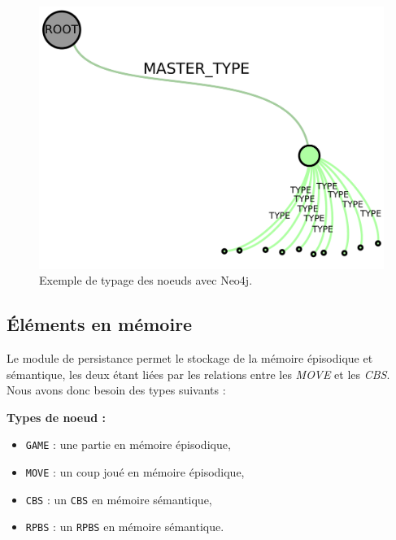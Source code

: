 \begin{figure}[H]
\includegraphics[width=\textwidth]{files/neo4j/example_node_type}
\caption{Exemple de typage des noeuds avec Neo4j.}
\label{example_node_type}
\end{figure}

\subsection{Éléments en mémoire}

Le module de persistance permet le stockage de la mémoire épisodique et sémantique, les deux étant liées par les relations entre les \emph{MOVE} et les \emph{CBS}. Nous avons donc besoin des types suivants : 

\textbf{Types de noeud :}
\begin{itemize}
	\item \texttt{GAME} : une partie en mémoire épisodique, 
	\item \texttt{MOVE} : un coup joué en mémoire épisodique,
	\item \texttt{CBS} : un \texttt{CBS} en mémoire sémantique,
	\item \texttt{RPBS} : un \texttt{RPBS} en mémoire sémantique.
\end{itemize}


